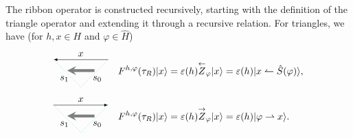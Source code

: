 \documentclass[a4paper,11pt]{article}
\theoremstyle{theorem}
\theoremstyle{remark}
\newcommand{\ZR}{\overset{\rightarrow}{Z}}
\newcommand{\ZL}{\overset{\leftarrow}{Z}}
\begin{document}
The ribbon operator is constructed recursively, starting with the definition of the triangle operator and extending it through a recursive relation.
For triangles, we have (for $h,x\in H$ and $\varphi \in \hat{H}$)
\begin{align}
	&	\begin{aligned}
		\begin{tikzpicture}
			\draw[-latex,black] (1,0) -- (-1,0); 
			\node[ line width=0.2pt, dashed, draw opacity=0.5] (a) at (0,0.2){$x$};
			\draw[dotted, cyan, line width=0.5pt] (-1,0) -- (0,-1);
			\node[ line width=0.2pt, dashed, draw opacity=0.5] (a) at (-0.6,-0.7){$s_1$};
			\draw[dotted, cyan, line width=0.5pt] (1,0) -- (0,-1);
			\node[ line width=0.2pt, dashed, draw opacity=0.5] (a) at (0.6,-0.7){$s_0$};
			\draw[-stealth,gray, line width=3pt] (0.5,-0.4) -- (-0.5,-0.4); 
		\end{tikzpicture}
	\end{aligned}
	\quad
	\begin{aligned}
		F^{h,\varphi}( \tau_R)|x\rangle =  
		\varepsilon(h)  \ZL_{\varphi} |x\rangle
		=  \varepsilon(h) | x \leftharpoonup \hat{S}( \varphi) \rangle,
	\end{aligned} \label{eq:tri1} \\
	&\begin{aligned}
		\begin{tikzpicture}
			\draw[-latex,black] (-1,0) -- (1,0); 
			\node[ line width=0.2pt, dashed, draw opacity=0.5] (a) at (0,0.2){$x$};
			\draw[dotted, cyan, line width=0.5pt] (-1,0) -- (0,-1);
			\node[ line width=0.2pt, dashed, draw opacity=0.5] (a) at (-0.6,-0.7){$s_1$};
			\draw[dotted, cyan, line width=0.5pt] (1,0) -- (0,-1);
			\node[ line width=0.2pt, dashed, draw opacity=0.5] (a) at (0.6,-0.7){$s_0$};
			\draw[-stealth,gray, line width=3pt] (0.5,-0.4) -- (-0.5,-0.4); 
		\end{tikzpicture}
	\end{aligned}
	\quad
	\begin{aligned}
		F^{h,\varphi}( \tau_R)|x\rangle = 	\varepsilon(h)  \ZR_{\varphi} |x\rangle
		= \varepsilon(h) | \varphi \rightharpoonup x \rangle.
	\end{aligned}
\end{align}
\end{document}

